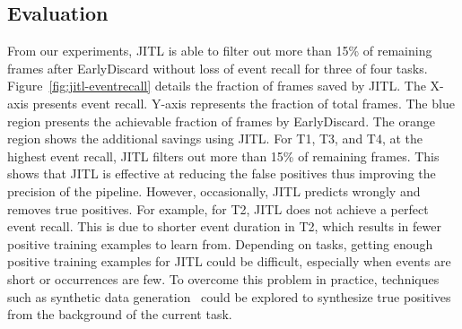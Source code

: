 \subsection{Evaluation}

From our experiments, JITL is able to filter out more than 15\% of remaining
frames after EarlyDiscard without loss of event recall for three of four tasks.
Figure~\ref{fig:jitl-eventrecall} details the fraction of frames saved by JITL.
The X-axis presents event recall. Y-axis represents the fraction of total
frames. The blue region presents the achievable fraction of frames by
EarlyDiscard. The orange region shows the additional savings using JITL. For T1,
T3, and T4, at the highest event recall, JITL filters out more than 15\% of
remaining frames. This shows that JITL is effective at reducing the false
positives thus improving the precision of the pipeline. However,
occasionally, JITL predicts wrongly and removes true positives. For example, for
T2, JITL does not achieve a perfect event recall. This is due to shorter event
duration in T2, which results in fewer positive training examples to learn
from. Depending on tasks, getting enough positive training examples for JITL
could be difficult, especially when events are short or occurrences are few. To
overcome this problem in practice, techniques such as synthetic data
generation~\cite{dwibedi2017cut} could be explored to synthesize true positives
from the background of the current task.
